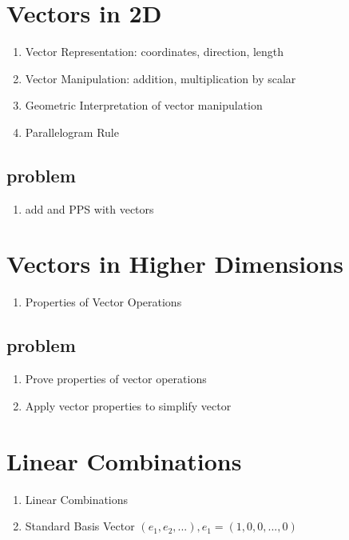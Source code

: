 \documentclass{article}
\begin{document}
\section{Vectors in 2D}

\begin{enumerate}
    \item Vector Representation: coordinates, direction, length
    \item Vector Manipulation: addition, multiplication by scalar
    \item Geometric Interpretation of vector manipulation
    \item Parallelogram Rule
\end{enumerate}

\subsection{problem}

\begin{enumerate}
    \item add and PPS with vectors
\end{enumerate}

\section{Vectors in Higher Dimensions}

\begin{enumerate}
    \item Properties of Vector Operations
\end{enumerate}

\subsection{problem}
\begin{enumerate}
    \item Prove properties of vector operations
    \item Apply vector properties to simplify vector
\end{enumerate}

\section{Linear Combinations}

\begin{enumerate}
    \item Linear Combinations
    \item Standard Basis Vector $ (e_1, e_2, ...), e_1 = (1, 0, 0, ..., 0)$
\end{enumerate}
\end{document}
